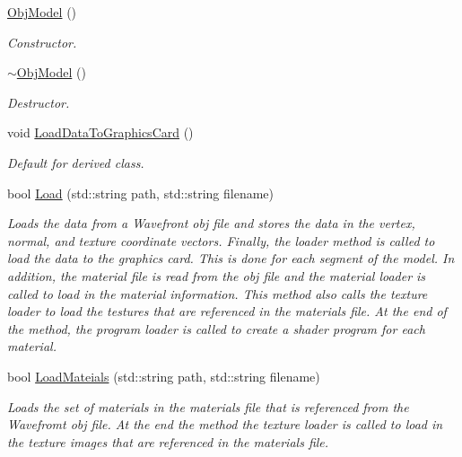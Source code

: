 \begin{DoxyCompactItemize}
\item 
\hyperlink{class_obj_model_af7c00f757992e626f2dd959f4c829125}{Obj\+Model} ()
\begin{DoxyCompactList}\small\item\em Constructor. \end{DoxyCompactList}\item 
\hyperlink{class_obj_model_a78d50e0da345b8b2438bbc93ae01eab8}{$\sim$\+Obj\+Model} ()
\begin{DoxyCompactList}\small\item\em Destructor. \end{DoxyCompactList}\item 
\mbox{\label{class_obj_model_ad248db3133fb781c2aebabe2e083f917}} 
void \hyperlink{class_obj_model_ad248db3133fb781c2aebabe2e083f917}{Load\+Data\+To\+Graphics\+Card} ()
\begin{DoxyCompactList}\small\item\em Default for derived class. \end{DoxyCompactList}\item 
bool \hyperlink{class_obj_model_a3aa8527dfa60ff71adb8a11833c164a5}{Load} (std\+::string path, std\+::string filename)
\begin{DoxyCompactList}\small\item\em Loads the data from a Wavefront obj file and stores the data in the vertex, normal, and texture coordinate vectors. Finally, the loader method is called to load the data to the graphics card. This is done for each segment of the model. In addition, the material file is read from the obj file and the material loader is called to load in the material information. This method also calls the texture loader to load the testures that are referenced in the materials file. At the end of the method, the program loader is called to create a shader program for each material. \end{DoxyCompactList}\item 
bool \hyperlink{class_obj_model_ac67e39ccdee938c1666f1d20542fd1d0}{Load\+Mateials} (std\+::string path, std\+::string filename)
\begin{DoxyCompactList}\small\item\em Loads the set of materials in the materials file that is referenced from the Wavefromt obj file. At the end the method the texture loader is called to load in the texture images that are referenced in the materials file. \end{DoxyCompactList}\item 

\end{DoxyCompactItemize}
